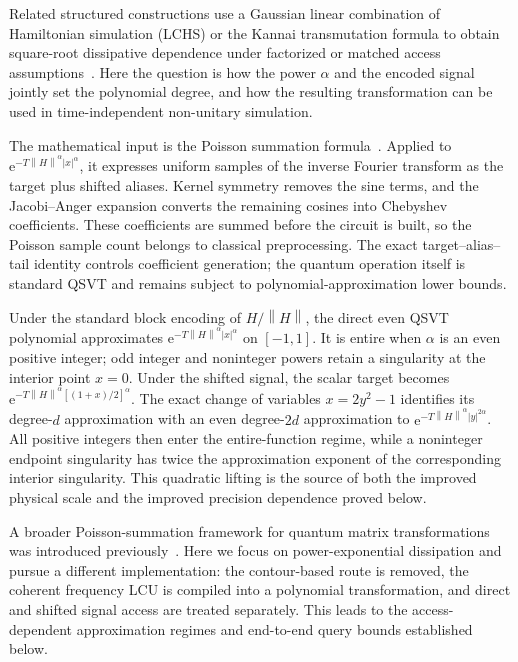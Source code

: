 \documentclass[aps,pra,reprint,floatfix,unsortedaddress,superscriptaddress]{revtex4-2}
\newcommand{\norm}[1]{\left\lVert#1\right\rVert}
\newcommand{\abs}[1]{\left\lvert#1\right\rvert}
\begin{document}
Related structured constructions use a Gaussian linear combination of
Hamiltonian simulation (LCHS) or the Kannai transmutation formula to
obtain square-root dissipative dependence under factorized or matched
access assumptions~\cite{Kannai01011977,
jin2026transmutationbasedquantumsimulation,
kharazi2026sublineartimequantumalgorithmhighdimensional}.  Here the
question is how the power $\alpha$ and the encoded signal jointly set
the polynomial degree, and how the resulting transformation can be
used in time-independent non-unitary simulation.

The mathematical input is the Poisson summation
formula~\cite{Miller2004,stein1971introduction,
katznelson2004introduction}.  Applied to
$\mathrm e^{-T\norm{H}^{\alpha}\abs{x}^{\alpha}}$, it expresses uniform
samples of the inverse Fourier transform as the target plus shifted
aliases.  Kernel symmetry removes the sine terms, and the
Jacobi--Anger expansion converts the remaining cosines into Chebyshev
coefficients.  These coefficients are summed before the circuit is
built, so the Poisson sample count belongs to classical preprocessing.
The exact target--alias--tail identity controls coefficient generation;
the quantum operation itself is standard QSVT and remains subject to
polynomial-approximation lower bounds.

Under the standard block encoding of $H/\norm{H}$, the direct even QSVT
polynomial approximates
$\mathrm e^{-T\norm{H}^{\alpha}\abs{x}^{\alpha}}$ on $[-1,1]$.  It
is entire when $\alpha$ is an even positive integer; odd
integer and noninteger powers retain a singularity at the interior
point $x=0$.  Under the shifted signal, the scalar target becomes
$\mathrm e^{-T\norm{H}^{\alpha}[(1+x)/2]^\alpha}$.  The exact change
of variables $x=2y^2-1$ identifies its degree-$d$ approximation with
an even degree-$2d$ approximation to
$\mathrm e^{-T\norm{H}^{\alpha}\abs{y}^{2\alpha}}$.  All positive
integers then enter the entire-function regime, while a
noninteger endpoint singularity has twice the approximation exponent
of the corresponding interior singularity.  This quadratic lifting is
the source of both the improved physical scale and the improved
precision dependence proved below.

A broader Poisson-summation framework for quantum matrix
transformations was introduced previously~\cite{wang2026unified}.  Here
we focus on power-exponential dissipation and pursue a different
implementation: the contour-based route is removed, the coherent
frequency LCU is compiled into a polynomial transformation, and direct and
shifted signal access are treated separately.  This leads to the
access-dependent approximation regimes and end-to-end query bounds
established below.
\end{document}
